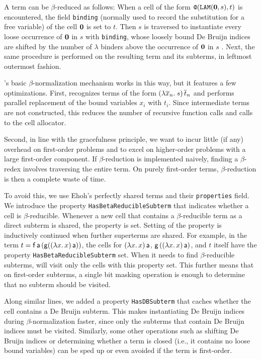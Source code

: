A term can be $\beta$-reduced as follows: When a cell of the
form $ \texttt{@}(\texttt{LAM}(\mathbf{0}, s),t)$ is encountered, the field
\texttt{binding} (normally used to record the substitution for a free variable) of the
cell $\mathbf{0}$ is set to $t$. Then $s$ is traversed to instantiate every
loose occurrence of $\mathbf{0}$ in $s$ with \texttt{binding}, whose loosely
bound De Bruijn indices are shifted by the number of $\lambda$ binders above
the occurrence of $\mathbf{0}$ in $s$ \cite{fk-01-deBruijn}. Next, the same
procedure is performed on the resulting term and its subterms, in
leftmost outermost fashion.

\ehohii{}'s basic $\beta$-normalization mechanism works in this way, but it
features a few optimizations.
First, \ehohii{} recognizes terms of the form $(\lambda \overline{x}_n.\> s) \,\overline{t}_n$ 
and performs parallel replacement of the bound variables $x_i$ with
$t_i$. Since intermediate terms are not constructed, this reduces the number of
recursive function calls and calls to the cell allocator.

Second, in line with the gracefulness principle, we want \ehohii{} to incur
little (if any) overhead on first-order problems and to
excel on higher-order problems with a large first-order component. If
$\beta$-reduction is implemented naively, finding a $\beta$-redex involves
traversing the entire term. On purely first-order terms, $\beta$-reduction
is then a complete waste of time.

To avoid this, we use Ehoh's perfectly shared
terms and their \texttt{properties} field.
%
We introduce the property \texttt{HasBetaReducibleSubterm} that indicates whether
a cell is $\beta$-reducible.
Whenever a new cell that contains a
$\beta$-reducible term as a direct subterm is shared, the property is set.
Setting of the property is inductively continued when further superterms are
shared. For example, in the term $t = \mathsf{f} \, \mathsf{a} \, (\mathsf{g} ((\lambda x.\,
x)\,\mathsf{a}))$, the cells for $(\lambda x.\, x)\,\mathsf{a}$,
$\mathsf{g}\,((\lambda x.\, x)\,\mathsf{a})$, and $t$ itself have the property
\texttt{HasBetaReducibleSubterm} set.
%
When it needs to find $\beta$-reducible subterms, \ehohii{} will visit only the
cells with this property set. This further means that on first-order
subterms, a single bit masking operation is enough to determine that no subterm
should be visited.

Along similar lines, we added a property \texttt{HasDBSubterm} that
caches whether the cell contains a De Bruijn subterm. This
makes
instantiating De Bruijn indices during $\beta$-normalization faster, since only the
subterms that contain De Bruijn indices must be visited. Similarly, some other
operations such as shifting De Bruijn indices or determining whether a term is closed
(i.e., it contains no loose bound variables) can be sped up or even avoided
if the term is first-order.

